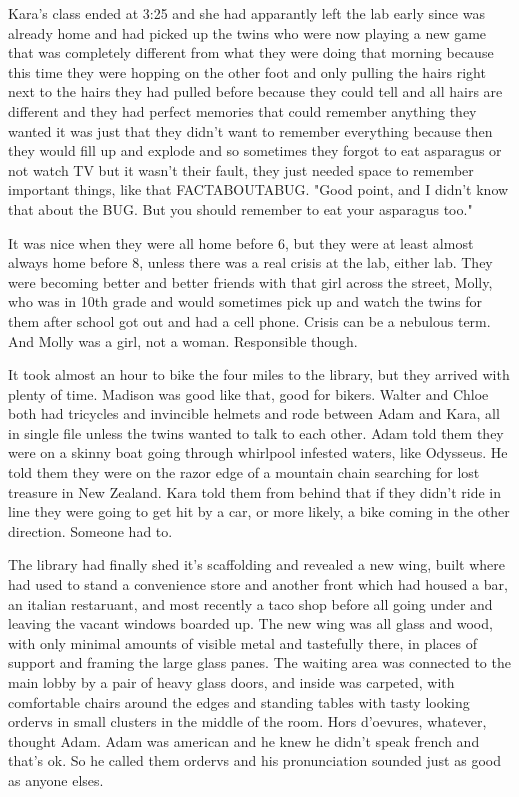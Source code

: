 Kara's class ended at 3:25 and she had apparantly left the lab early since was already home and had picked up the twins who were now playing a new game that was completely different from what they were doing that morning because this time they were hopping on the other foot and only pulling the hairs right next to the hairs they had pulled before because they could tell and all hairs are different and they had perfect memories that could remember anything they wanted it was just that they didn't want to remember everything because then they would fill up and explode and so sometimes they forgot to eat asparagus or not watch TV but it wasn't their fault, they just needed space to remember important things, like that FACTABOUTABUG. "Good point, and I didn't know that about the BUG. But you should remember to eat your asparagus too."

It was nice when they were all home before 6, but they were at least almost always home before 8, unless there was a real crisis at the lab, either lab. They were becoming better and better friends with that girl across the street, Molly, who was in 10th grade and would sometimes pick up and watch the twins for them after school got out and had a cell phone. Crisis can be a nebulous term. And Molly was a girl, not a woman. Responsible though.

\mymark

It took almost an hour to bike the four miles to the library, but they arrived with plenty of time. Madison was good like that, good for bikers. Walter and Chloe both had tricycles and invincible helmets and rode between Adam and Kara, all in single file unless the twins wanted to talk to each other. Adam told them they were on a skinny boat going through whirlpool infested waters, like Odysseus. He told them they were on the razor edge of a mountain chain searching for lost treasure in New Zealand. Kara told them from behind that if they didn't ride in line they were going to get hit by a car, or more likely, a bike coming in the other direction. Someone had to.

The library had finally shed it's scaffolding and revealed a new wing, built where had used to stand a convenience store and another front which had housed a bar, an italian restaruant, and most recently a taco shop before all going under and leaving the vacant windows boarded up. The new wing was all glass and wood, with only minimal amounts of visible metal and tastefully there, in places of support and framing the large glass panes. The waiting area was connected to the main lobby by a pair of heavy glass doors, and inside was carpeted, with comfortable chairs around the edges and standing tables with tasty looking ordervs in small clusters in the middle of the room. Hors d'oevures, whatever, thought Adam. Adam was american and he knew he didn't speak french and that's ok. So he called them ordervs and his pronunciation sounded just as good as anyone elses. 

